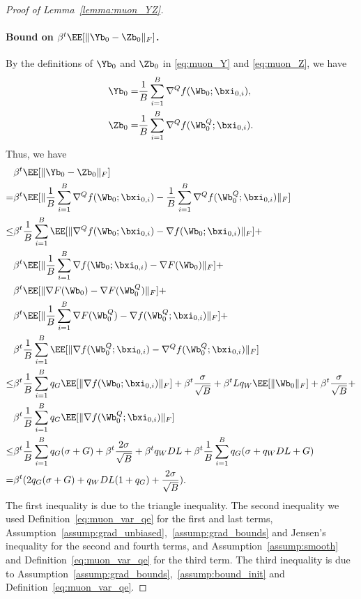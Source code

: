 \documentclass[11pt, letterpaper]{article}
\begin{document}
\begin{proof}[Proof of Lemma~\ref{lemma:muon_YZ}]
\paragraph{Bound on $\beta^t \EE[\| \Yb_{0} - \Zb_{0} \|_F]$.}
    By the definitions of $\Yb_0$ and $\Zb_0$ in \eqref{eq:muon_Y} and \eqref{eq:muon_Z}, we have
    \begin{align*}
        \Yb_0 =& \frac{1}{B}\sum_{i=1}^B\nabla^Q f(\Wb_0;\bxi_{0,i}), \\
        \Zb_0 =& \frac{1}{B}\sum_{i=1}^B\nabla^Q f(\Wb_0^Q;\bxi_{0,i}).
    \end{align*}
    Thus, we have
    \begin{align}\label{eq:muon_YZ_0}
        &\beta^t \EE[\| \Yb_{0} - \Zb_{0} \|_F] \notag \\
        =& \beta^t \EE[\|\frac{1}{B}\sum_{i=1}^B\nabla^Q f(\Wb_0;\bxi_{0,i}) - \frac{1}{B}\sum_{i=1}^B\nabla^Q f(\Wb_0^Q;\bxi_{0,i})\|_F] \notag \\
        \le& \beta^t \frac{1}{B}\sum_{i=1}^B \EE[\|\nabla^Q f(\Wb_0;\bxi_{0,i}) - \nabla f(\Wb_0;\bxi_{0,i})\|_F] + \notag \\
        & \beta^t  \EE[\|\frac{1}{B}\sum_{i=1}^B\nabla f(\Wb_0;\bxi_{0,i}) - \nabla F(\Wb_0)\|_F] + \notag \\
        & \beta^t \EE[\|\nabla F(\Wb_0) - \nabla F(\Wb_0^Q)\|_F] + \notag \\
        & \beta^t  \EE[\|\frac{1}{B}\sum_{i=1}^B\nabla F(\Wb_0^Q) - \nabla f(\Wb_0^Q;\bxi_{0,i}) \|_F] + \notag \\
        & \beta^t \frac{1}{B}\sum_{i=1}^B \EE[\|\nabla f(\Wb_0^Q;\bxi_{0,i}) - \nabla^Q f(\Wb_0^Q;\bxi_{0,i}) \|_F] \notag \\
        \le& \beta^t\frac{1}{B}\sum_{i=1}^B q_G\EE[\|\nabla f(\Wb_0;\bxi_{0,i})\|_F] + \beta^t\frac{\sigma}{\sqrt{B}} + \beta^t L q_W\EE[\|\Wb_0\|_F] + \beta^t\frac{\sigma}{\sqrt{B}} + \notag \\
        & \beta^t\frac{1}{B}\sum_{i=1}^B q_G\EE[\|\nabla f(\Wb_0^Q;\bxi_{0,i})\|_F] \notag \\
        \le& \beta^t\frac{1}{B}\sum_{i=1}^B q_G(\sigma + G) + \beta^t\frac{2\sigma}{\sqrt{B}} + \beta^t q_W DL + \beta^t\frac{1}{B}\sum_{i=1}^B q_G(\sigma+q_W D L+G) \notag \\
        =& \beta^t(2q_G(\sigma+G) + q_W DL(1+q_G)+ \frac{2\sigma}{\sqrt{B}} ).
    \end{align}
    The first inequality is due to the triangle inequality. The second inequality we used Definition~\ref{eq:muon_var_qe} for the first and last terms, Assumption~\ref{assump:grad_unbiased},~\ref{assump:grad_bounds} and Jensen's inequality for the second and fourth terms, and Assumption~\ref{assump:smooth} and Definition~\ref{eq:muon_var_qe} for the third term. The third inequality is due to Assumption~\ref{assump:grad_bounds},~\ref{assump:bound_init} and Definition~\ref{eq:muon_var_qe}.


\end{proof}
\end{document}

